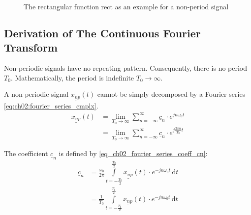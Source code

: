 \begin{refsection}
\begin{figure}[H]
	\centering
	\caption{The rectangular function $\mathrm{rect}$ as an example for a non-period signal}
	\label{fig:ch02:rect_function}
\end{figure}

\subsection{Derivation of The Continuous Fourier Transform}

Non-periodic signals have no repeating pattern. Consequently, there is no period $T_0$. Mathematically, the period is indefinite $T_0 \rightarrow \infty$.

A non-periodic signal $\underline{x_{np}}(t)$ cannot be simply decomposed by a Fourier series \eqref{eq:ch02:fourier_series_cmplx}.
\begin{equation}
	\begin{split}
		\underline{x_{np}}(t) &= \lim\limits_{T_0 \rightarrow \infty} \sum\limits_{n = -\infty}^{\infty} \underline{c}_n \cdot e^{j n \omega_0 t} \\
		 &= \lim\limits_{T_0 \rightarrow \infty} \sum\limits_{n = -\infty}^{\infty} \underline{c}_n \cdot e^{j \frac{2 \pi n}{T_0} t}
	\end{split}
	\label{eq:ch02:sig_np_fourier_series}
\end{equation}

The coefficient $\underline{c}_n$ is defined by \eqref{eq_ch02_fourier_series_coeff_cn}:
\begin{equation*}
	\begin{split}
		\underline{c}_n &= \frac{\omega_0}{2 \pi} \int\limits_{t = -\frac{T_0}{2}}^{\frac{T_0}{2}} \underline{x_{np}}(t) \cdot e^{-j n \omega_0 t} \, \mathrm{d} t \\
		 &= \frac{1}{T_0} \int\limits_{t = -\frac{T_0}{2}}^{\frac{T_0}{2}} \underline{x_{np}}(t) \cdot e^{-j n \omega_0 t} \, \mathrm{d} t
	\end{split}
	\label{eq:ch02:sig_np_cn}
\end{equation*}


\end{refsection}
